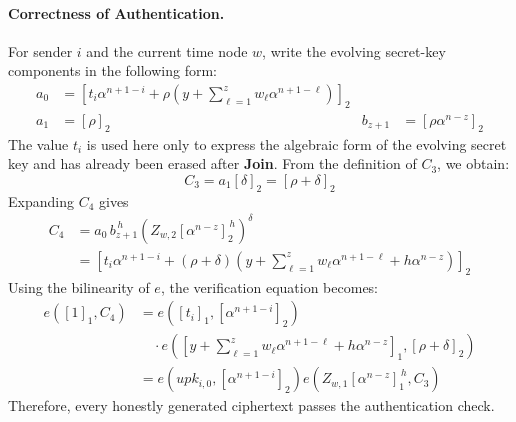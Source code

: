 \documentclass[sigconf,anonymous]{acmart}
\theoremstyle{definition}
\theoremstyle{definition}
\theoremstyle{definition}
\theoremstyle{definition}
\theoremstyle{definition}
\theoremstyle{definition}
\theoremstyle{definition}
\theoremstyle{definition}
\theoremstyle{definition}
\begin{document}
\paragraph{Correctness of Authentication.}
For sender $i$ and the current time node $w$, write the evolving
secret-key components in the following form:
\[
\begin{aligned}
	a_0
	&=
	\left[
	t_i\alpha^{n+1-i}
	+
	\rho
	\left(
	y+
	\sum_{\ell=1}^{z}
	w_\ell\alpha^{n+1-\ell}
	\right)
	\right]_2
	\\
	a_1
	&=
	[\rho]_2
	&
	b_{z+1}
	&=
	[\rho\alpha^{n-z}]_2
\end{aligned}
\]
The value $t_i$ is used here only to express the algebraic form of the
evolving secret key and has already been erased after \textbf{Join}.
From the definition of $C_3$, we obtain:
\[
C_3
=
a_1[\delta]_2
=
[\rho+\delta]_2
\]
Expanding $C_4$ gives
\[
\begin{aligned}
	C_4
	&=
	a_0\,b_{z+1}^{\,h}
	\left(
	Z_{w,2}[\alpha^{n-z}]_2^{\,h}
	\right)^\delta
	\\
	&=
	\left[
	t_i\alpha^{n+1-i}
	+
	(\rho+\delta)
	\left(
	y+
	\sum_{\ell=1}^{z}
	w_\ell\alpha^{n+1-\ell}
	+
	h\alpha^{n-z}
	\right)
	\right]_2
\end{aligned}
\]
Using the bilinearity of $e$, the verification equation becomes:
\[
\begin{aligned}
	e([1]_1,C_4)
	&=
	e\left(
	[t_i]_1,
	[\alpha^{n+1-i}]_2
	\right)
	\\
	&\quad\cdot
	e\left(
	\left[
	y+
	\sum_{\ell=1}^{z}
	w_\ell\alpha^{n+1-\ell}
	+
	h\alpha^{n-z}
	\right]_1,
	[\rho+\delta]_2
	\right)
	\\
	&=
	e\left(
	upk_{i,0},
	[\alpha^{n+1-i}]_2
	\right)
	e\left(
	Z_{w,1}[\alpha^{n-z}]_1^{\,h},
	C_3
	\right)
\end{aligned}
\]
Therefore, every honestly generated ciphertext passes the
authentication check.
\end{document}
